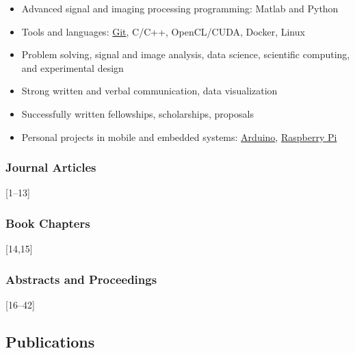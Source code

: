 \documentclass[
]{article}
\providecommand{\tightlist}{%
  \setlength{\itemsep}{0pt}\setlength{\parskip}{0pt}}
\begin{document}
\begin{itemize}
\tightlist
\item
  Advanced signal and imaging processing programming: Matlab and Python
\item
  Tools and languages: \href{http://git-scm.com/}{Git}, C/C++,
  OpenCL/CUDA, Docker, Linux
\item
  Problem solving, signal and image analysis, data science, scientific
  computing, and experimental design
\item
  Strong written and verbal communication, data visualization
\item
  Successfully written fellowships, scholarships, proposals
\item
  Personal projects in mobile and embedded systems:
  \href{http://www.arduino.cc/}{Arduino},
  \href{http://www.raspberrypi.org/}{Raspberry Pi}
\end{itemize}

\hypertarget{journal-articles}{%
\subsubsection{Journal Articles}\label{journal-articles}}

{[}1--13{]}

\hypertarget{book-chapters}{%
\subsubsection{Book Chapters}\label{book-chapters}}

{[}14,15{]}

\hypertarget{abstracts-and-proceedings}{%
\subsubsection{Abstracts and
Proceedings}\label{abstracts-and-proceedings}}

{[}16--42{]}

\hypertarget{publications}{%
\subsection*{Publications}\label{publications}}
\end{document}
